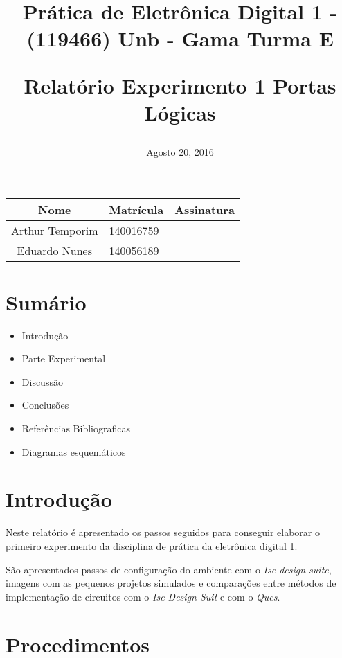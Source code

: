 \documentclass[12pts]{article}
\title{
	Prática de Eletrônica Digital 1 - (119466)
	Unb - Gama
	\singlespace
	Turma E
	\singlespacing
	\begin{midpage}
	\begin {large}
		Relatório Experimento 1
		\singlespace
		Portas Lógicas
	\end {large}
	\end{midpage}
}
\date{Agosto 20, 2016}
\begin{document}
\maketitle	
\begin{center}

\begin{tabular}{|c|l|r|}
\hline
Nome & Matrícula & Assinatura\\
\hline
Arthur Temporim & 140016759 & \\
\hline	
Eduardo Nunes & 140056189 & \\
\hline	
\end{tabular}

\end{center}


\newpage

\section{Sumário}

\begin{itemize}
	\item Introdução
	\singlespacing
	\item Parte Experimental
	\singlespacing
	\item Discussão
	\singlespacing
	\item Conclusões 
	\singlespacing
	\item Referências Bibliograficas
	\singlespacing
	\item Diagramas esquemáticos
\end{itemize}

\newpage


\section{Introdução}
\iffalse
Introdução, indicando a delimitação do tema, apresentando a justificativa descrevendo o propósito do relatório.
\fi
	Neste relatório é apresentado os passos seguidos para conseguir elaborar o primeiro experimento da disciplina de prática da eletrônica digital 1.

	São apresentados passos de configuração do ambiente com o \textit{Ise design suite}, imagens com as pequenos projetos simulados e comparações entre métodos de implementação de circuitos com o \textit{Ise Design Suit} e com o \textit{Qucs}.

\section{Procedimentos}
\iffalse
Parte Experimental, descrevendo os passos realizados, dificuldades e soluções para os problemas encontrados. Aqui, deve-se apresentar uma descrição dos resultados encontrados em forma de figuras, gráficos e tabelas.
\fi
\end{document}
